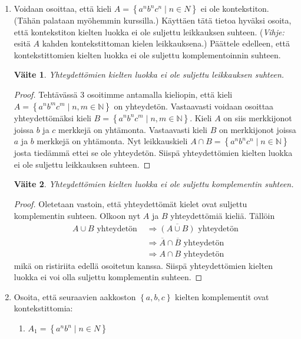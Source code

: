 \documentclass[a4paper,11pt]{article}
\newtheorem*{claim}{Väite}
\newcommand{\set}[1]{{\left\{ #1 \right\}}}
\newcommand{\Nat}{\mathbb{N}}
\begin{document}
\begin{enumerate}
\item
  Voidaan osoittaa, että kieli $A=\set{ a^n b^n c^n\mid n\in N}$ ei
  ole kontekstiton. (Tähän palataan myöhemmin kurssilla.) Käyttäen
  tätä tietoa hyväksi osoita, että kontekstiton kielten luokka ei ole
  suljettu leikkauksen suhteen. ({\em Vihje:} esitä $A$ kahden
  kontekstittoman kielen leikkauksena.) Päättele edelleen, että
  kontekstittomien kielten luokka ei ole suljettu komplementoinnin
  suhteen.
  \begin{claim}
    Yhteydettömien kielten luokka ei ole suljettu leikkauksen suhteen.
  \end{claim}
  \begin{proof}
    Tehtävässä 3 osoitimme antamalla kieliopin, että kieli $A =
    \set{a^nb^mc^m \mid n,m \in \Nat}$ on yhteydetön. Vastaavasti
    voidaan osoittaa yhteydettömäksi kieli $B = \set{a^nb^nc^m \mid
      n,m \in \Nat}$. Kieli $A$ on siis merkkijonot joissa $b$ ja $c$
    merkkejä on yhtämonta. Vastaavasti kieli $B$ on merkkijonot joissa
    $a$ ja $b$ merkkejä on yhtämonta. Nyt leikkauskieli $A \cap B =
    \set{a^nb^nc^n \mid n \in \Nat}$ josta tiedämmä ettei se ole
    yhteydetön. Siispä yhteydettömien kielten luokka ei ole suljettu
    leikkauksen suhteen.
  \end{proof}
  \begin{claim}
    Yhteydettömien kielten luokka ei ole suljettu komplementin suhteen.
  \end{claim}
  \begin{proof}
    Oletetaan vastoin, että yhteydettömät kielet ovat suljettu
    komplementin suhteen. Olkoon nyt $A$ ja $B$ yhteydettömiä kieliä.
    Tällöin
    \begin{align*}
      A \cup B \text{ yhteydetön }
      & \Rightarrow \overline{(A \cup B)} \text{ yhteydetön} \\
      & \Rightarrow \overline{A} \cap \overline{B} \text{ yhteydetön} \\
      & \Rightarrow A \cap B \text{ yhteydetön}
    \end{align*}
    mikä on ristiriita edellä osoitetun kanssa. Siispä yhteydettömien
    kielten luokka ei voi olla suljettu komplementin suhteen.
  \end{proof}

\item
  Osoita, että seuraavien aakkoston $\set{a,b,c}$ kielten komplementit
  ovat kontekstittomia:
%
  \begin{enumerate}
  \item
    $A_1=\set{a^n b^n \mid n \in N}$


\end{enumerate}
\end{enumerate}
\end{document}
